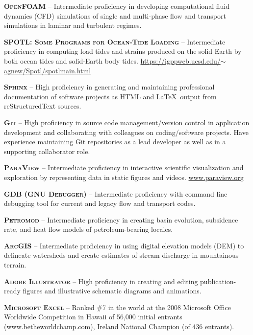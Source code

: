 \documentclass[11pt, letterpaper]{article}
\begin{document}
\textbf{\textsc{OpenFOAM}} -- Intermediate proficiency in developing computational fluid
dynamics (CFD) simulations of single and multi-phase flow and transport
simulations in laminar and turbulent regimes.

\textbf{\textsc{SPOTL: Some Programs for Ocean-Tide Loading}} -- Intermediate proficiency in
computing load tides and strains produced on the solid Earth by both ocean
tides and solid-Earth body tides.
\href{https://igppweb.ucsd.edu/~agnew/Spotl/spotlmain.html}{https://igppweb.ucsd.edu/\(\sim \)agnew/Spotl/spotlmain.html}

\textbf{\textsc{Sphinx}} -- High proficiency in generating and maintaining professional
documentation of software projects as HTML and \LaTeX \ output from
reStructuredText sources.

\textbf{\textsc{Git}} -- High proficiency in source code management/version control
in application development and collaborating with colleagues on coding/software
projects. Have experience maintaining Git repositories as a lead developer as
well as in a supporting collaborator role.

\textbf{\textsc{ParaView}} -- Intermediate proficiency in interactive scientific
visualization and exploration by representing data in static figures and
videos. \href{https://www.paraview.org/}{www.paraview.org} 

\textbf{\textsc{GDB (GNU Debugger)}} -- Intermediate proficiency with command line debugging
tool for current and legacy flow and transport codes.

\textbf{\textsc{Petromod}} -- Intermediate proficiency in creating basin evolution,
subsidence rate, and heat flow models of petroleum-bearing
locales.

\textbf{\textsc{ArcGIS}} -- Intermediate proficiency in using digital elevation models (DEM)
to delineate watersheds and create estimates of stream discharge in mountainous
terrain.

\textbf{\textsc{Adobe Illustrator}} -- High proficiency in creating and editing
publication-ready figures and illustrative schematic diagrams and animations.

\textbf{\textsc{Microsoft Excel}} -- Ranked \#7 in the world at the 2008 Microsoft Office
Worldwide Competition in Hawaii of 56,000 initial entrants
(www.betheworldchamp.com), Ireland National Champion (of 436 entrants).
\end{document}
